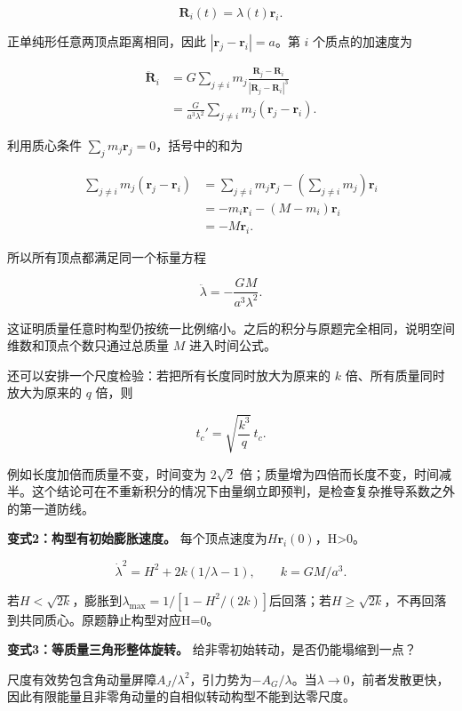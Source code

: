 \documentclass[12pt,a4paper,UTF8]{ctexart}
\begin{document}
\[
\boldsymbol R_i(t)=\lambda(t)\boldsymbol r_i.
\]

正单纯形任意两顶点距离相同，因此
\(|\boldsymbol r_j-\boldsymbol r_i|=a\)。第 \(i\) 个质点的加速度为

\[
\begin{aligned}
\ddot{\boldsymbol R}_i
&=G\sum_{j\ne i}m_j
\frac{\boldsymbol R_j-\boldsymbol R_i}
{|\boldsymbol R_j-\boldsymbol R_i|^3}\\
&=\frac{G}{a^3\lambda^2}
\sum_{j\ne i}m_j(\boldsymbol r_j-\boldsymbol r_i).
\end{aligned}
\]

利用质心条件 \(\sum_jm_j\boldsymbol r_j=0\)，括号中的和为

\[
\begin{aligned}
\sum_{j\ne i}m_j(\boldsymbol r_j-\boldsymbol r_i)
&=\sum_{j\ne i}m_j\boldsymbol r_j
-\left(\sum_{j\ne i}m_j\right)\boldsymbol r_i\\
&=-m_i\boldsymbol r_i-(M-m_i)\boldsymbol r_i\\
&=-M\boldsymbol r_i.
\end{aligned}
\]

所以所有顶点都满足同一个标量方程

\[
\ddot\lambda=-\frac{GM}{a^3\lambda^2}.
\]

这证明质量任意时构型仍按统一比例缩小。之后的积分与原题完全相同，说明空间维数和顶点个数只通过总质量
\(M\) 进入时间公式。

还可以安排一个尺度检验：若把所有长度同时放大为原来的 \(k\)
倍、所有质量同时放大为原来的 \(q\) 倍，则

\[
t_c'=\sqrt{\frac{k^3}{q}}\,t_c.
\]

例如长度加倍而质量不变，时间变为 \(2\sqrt2\)
倍；质量增为四倍而长度不变，时间减半。这个结论可在不重新积分的情况下由量纲立即预判，是检查复杂推导系数之外的第一道防线。

\textbf{变式2：构型有初始膨胀速度。}
每个顶点速度为\(H\boldsymbol r_i(0)\)，H\textgreater0。

\[\dot\lambda^2=H^2+2k(1/\lambda-1),\qquad k=GM/a^3.\]

若\(H<\sqrt{2k}\)，膨胀到\(\lambda_{\max}=1/[1-H^2/(2k)]\)后回落；若\(H\ge\sqrt{2k}\)，不再回落到共同质心。原题静止构型对应H=0。

\textbf{变式3：等质量三角形整体旋转。}
给非零初始转动，是否仍能塌缩到一点？

尺度有效势包含角动量屏障\(A_J/\lambda^2\)，引力势为\(-A_G/\lambda\)。当\(\lambda\to0\)，前者发散更快，因此有限能量且非零角动量的自相似转动构型不能到达零尺度。
\end{document}
